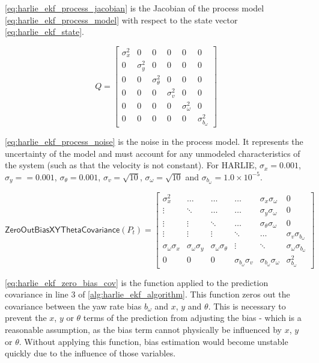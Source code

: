 \eqref{eq:harlie_ekf_process_jacobian} is the Jacobian of the process model \eqref{eq:harlie_ekf_process_model} with respect to the state vector \eqref{eq:harlie_ekf_state}.

\begin{equation}
	Q =
	\begin{bmatrix}
		\sigma_{x}^2 & 0 & 0 & 0 & 0 & 0 \\
		0 & \sigma_{y}^2 & 0 & 0 & 0 & 0 \\
		0 & 0 & \sigma_{\theta}^2 & 0 & 0 & 0 \\
		0 & 0 & 0 & \sigma_{v}^2 & 0 & 0 \\
		0 & 0 & 0 & 0 & \sigma_{\omega}^2 & 0 \\
		0 & 0 & 0 & 0 & 0 & \sigma_{b_{\omega}}^2
	\end{bmatrix}
	\label{eq:harlie_ekf_process_noise}
\end{equation}

\eqref{eq:harlie_ekf_process_noise} is the noise in the process model. It represents the uncertainty of the model and must account for any unmodeled characteristics of the system (such as that the velocity is not constant). For HARLIE, $\sigma_{x} = 0.001$, $\sigma_{y} == 0.001$, $\sigma_{\theta} = 0.001$, $\sigma_{v} = \sqrt{10}$, $\sigma_{\omega} = \sqrt{10}$ and $\sigma_{b_{\omega}} = 1.0\times 10^{-5}$.

\begin{equation}
	\mathsf{ZeroOutBiasXYThetaCovariance}\left(P_t\right) = 
	\begin{bmatrix}
		\sigma_x^2 & \ldots & \ldots & \ldots & \sigma_x\sigma_\omega & 0 \\
		\vdots & \ddots & \ldots & \ldots & \sigma_y\sigma_\omega & 0 \\
		\vdots & \vdots & \ddots & \ldots & \sigma_\theta\sigma_\omega & 0 \\
		\vdots & \vdots & \vdots & \ddots & \ldots & \sigma_v\sigma_{b_{\omega}} \\
		\sigma_\omega\sigma_x & \sigma_\omega\sigma_y & \sigma_\omega\sigma_\theta & \vdots & \ddots & \sigma_\omega\sigma_{b_{\omega}} \\
		0 & 0 & 0 & \sigma_{b_{\omega}}\sigma_v & \sigma_{b_{\omega}}\sigma_\omega & \sigma_{b_{\omega}}^2
	\end{bmatrix}
	\label{eq:harlie_ekf_zero_bias_cov}
\end{equation}

\eqref{eq:harlie_ekf_zero_bias_cov} is the function applied to the prediction covariance in line 3 of \autoref{alg:harlie_ekf_algorithm}. This function zeros out the covariance between the yaw rate bias $b_{\omega}$ and $x$, $y$ and $\theta$. This is necessary to prevent the $x$, $y$ or $\theta$ terms of the prediction from adjusting the bias - which is a reasonable assumption, as the bias term cannot physically be influenced by $x$, $y$ or $\theta$. Without applying this function, bias estimation would become unstable quickly due to the influence of those variables.

